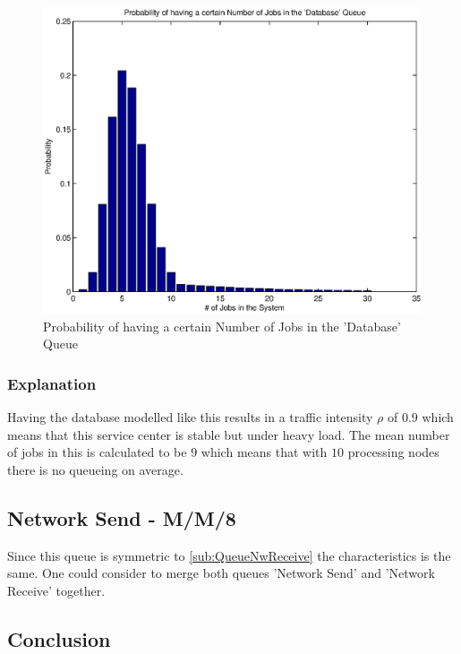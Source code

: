 \documentclass[a4paper]{article}
\begin{document}

\begin{figure}[H]
	\begin{center}
    \includegraphics[scale=0.6]{../plots-ms2-mg/queueanalysis-3Db.eps}
  \end{center}
  \caption{Probability of having a certain Number of Jobs in the 'Database' Queue}
  \label{fig:queueanalysis3}
\end{figure}


\subsubsection{Explanation}
Having the database modelled like this results in a traffic intensity $\rho$ of $0.9$ which means that this service center is stable but under heavy load. The mean number of jobs in this is calculated to be $9$ which means that with $10$ processing nodes there is no queueing on average.


\subsection{Network Send - M/M/8}
Since this queue is symmetric to \ref{sub:QueueNwReceive} the characteristics is the same. One could consider to merge both queues 'Network Send' and 'Network Receive' together.

\subsection{Conclusion}
\end{document}
